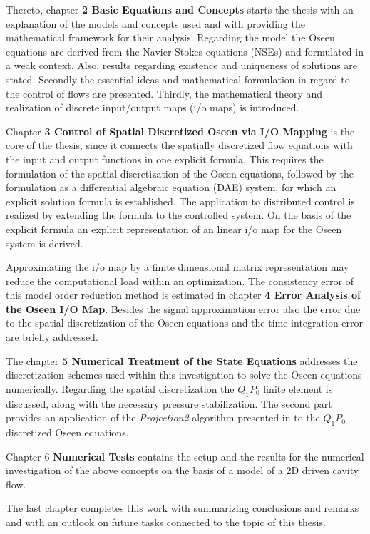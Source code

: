 \documentclass[a4paper,10pt,BCOR=15mm]{scrbook}
\begin{document}
Thereto, chapter \textbf{2 Basic Equations and Concepts} starts the thesis with an explanation of the models and concepts used and with providing the mathematical framework for their analysis. Regarding the model the Oseen equations are derived from the Navier-Stokes equations (NSEs) and formulated in a weak context. Also, results regarding existence and uniqueness of solutions are stated. Secondly the essential ideas and mathematical formulation in regard to the control of flows are presented. Thirdly, the mathematical theory and realization of discrete input/output maps (i/o maps) is introduced.

Chapter \textbf{3 Control of Spatial Discretized Oseen via I/O Mapping} is the core of the thesis, since it connects the spatially discretized flow equations with the input and output functions in one explicit formula. This requires the formulation of the spatial discretization of the Oseen equations, followed by the formulation as a differential algebraic equation (DAE) system, for which an explicit solution formula is established. The application to distributed control is realized by extending the formula to the controlled system. On the basis of the explicit formula an explicit representation of an linear i/o map for the Oseen system is derived.

Approximating the i/o map by a finite dimensional matrix representation may reduce the computational load within an optimization. The consistency error of this model order reduction method is estimated in chapter \textbf{4 Error Analysis of the Oseen I/O Map}. Besides the signal approximation error also the error due to the spatial discretization of the Oseen equations and the time integration error are briefly addressed.

The chapter \textbf{5 Numerical Treatment of the State Equations} addresses the discretization schemes used within this investigation to solve the Oseen equations numerically. Regarding the spatial discretization the $Q_1P_0$ finite element is discussed, along with the necessary pressure stabilization. The second part provides an application of the \textit{Projection2} algorithm presented in \cite{grea} to the $Q_1P_0$ discretized Oseen equations.

Chapter 6 \textbf{Numerical Tests} contains the setup and the results for the numerical investigation of the above concepts on the basis of a model of a 2D driven cavity flow. 

The last chapter completes this work with summarizing conclusions and remarks and with an outlook on future tasks connected to the topic of this thesis.
\end{document}
